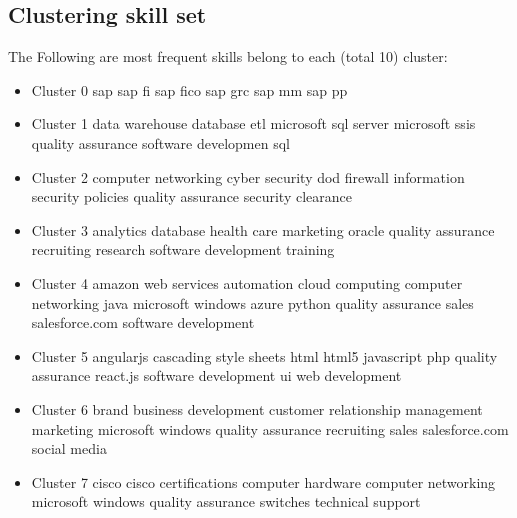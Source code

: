 \subsection{Clustering skill set}
The Following are  most frequent skills belong to each (total 10) cluster:
{\tiny
	\begin{itemize}
	\item Cluster 0
\subitem	sap	
\subitem	sap fi	
\subitem	sap fico	
\subitem	sap grc	
\subitem	sap mm
\subitem	sap pp	
	\item Cluster 1
\subitem	data warehouse	
\subitem	database
\subitem	etl	
\subitem	microsoft sql server
\subitem	microsoft ssis	
\subitem	quality assurance	
\subitem	software developmen
\subitem	sql
	\item Cluster 2
\subitem	computer networking	
\subitem	cyber security	
\subitem	dod	
\subitem	firewall	
\subitem	information security	
\subitem	policies	
\subitem	quality assurance	
\subitem	security clearance	
	
		\item Cluster 3
\subitem	analytics	
\subitem	database	
\subitem	health care	
\subitem	marketing	
\subitem	oracle	
\subitem	quality assurance	
\subitem	recruiting	
\subitem	research	
\subitem	software development	
\subitem	training	
		
			\item Cluster 4
\subitem	amazon web services	
\subitem	automation	
\subitem	cloud computing	
\subitem	computer networking	
\subitem	java	
\subitem	microsoft windows azure	
\subitem	python	
\subitem	quality assurance	
\subitem	sales	
\subitem	salesforce.com	
\subitem	software development	
			
				\item Cluster 5
\subitem	angularjs	
\subitem	cascading style sheets	
\subitem	html	
\subitem	html5	
\subitem	javascript	
\subitem	php	
\subitem	quality assurance	
\subitem	react.js	
\subitem	software development	
\subitem	ui	
\subitem	web development	
				
					\item Cluster 6
\subitem	brand	
\subitem	business development	
\subitem	customer relationship management	
\subitem	marketing	
\subitem	microsoft windows	
\subitem	quality assurance	
\subitem	recruiting	
\subitem	sales	
\subitem	salesforce.com	
\subitem	social media	
					
						\item Cluster 7
\subitem cisco	
\subitem	cisco certifications	
\subitem computer hardware	
\subitem	computer networking	
\subitem	microsoft windows	
\subitem	quality assurance	
\subitem	switches	
\subitem	technical support	
						

\end{itemize}}
